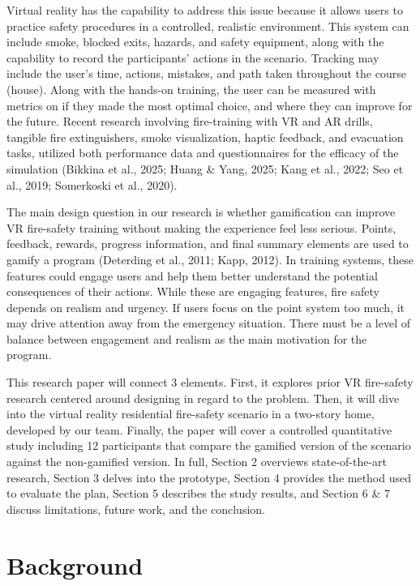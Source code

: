 \documentclass[manuscript, review]{acmart}
\begin{document}
{Virtual reality has the capability to address this issue because it allows users to practice safety procedures in a controlled, realistic environment. This system can include smoke, blocked exits, hazards, and safety equipment, along with the capability to record the participants' actions in the scenario. Tracking may include the user’s time, actions, mistakes, and path taken throughout the course (house). Along with the hands-on training, the user can be measured with metrics on if they made the most optimal choice, and where they can improve for the future. Recent research involving fire-training with VR and AR drills, tangible fire extinguishers, smoke visualization, haptic feedback, and evacuation tasks, utilized both performance data and questionnaires for the efficacy of the simulation (Bikkina et al., 2025; Huang & Yang, 2025; Kang et al., 2022; Seo et al., 2019; Somerkoski et al., 2020). 

 

The main design question in our research is whether gamification can improve VR fire-safety training without making the experience feel less serious. Points, feedback, rewards, progress information, and final summary elements are used to gamify a program (Deterding et al., 2011; Kapp, 2012). In training systems, these features could engage users and help them better understand the potential consequences of their actions. While these are engaging features, fire safety depends on realism and urgency. If users focus on the point system too much, it may drive attention away from the emergency situation. There must be a level of balance between engagement and realism as the main motivation for the program.  

 

This research paper will connect 3 elements. First, it explores prior VR fire-safety research centered around designing in regard to the problem. Then, it will dive into the virtual reality residential fire-safety scenario in a two-story home, developed by our team. Finally, the paper will cover a controlled quantitative study including 12 participants that compare the gamified version of the scenario against the non-gamified version. In full, Section 2 overviews state-of-the-art research, Section 3 delves into the prototype, Section 4 provides the method used to evaluate the plan, Section 5 describes the study results, and Section 6 & 7 discuss limitations, future work, and the conclusion.  

\section{Background}
}
\end{document}

